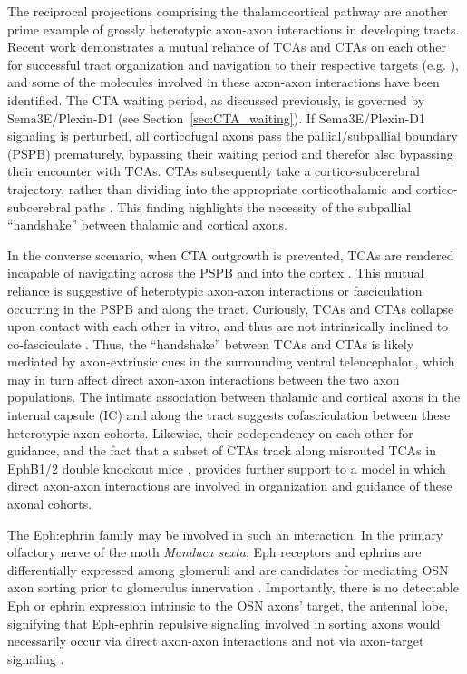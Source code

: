 The reciprocal projections comprising the thalamocortical pathway are another prime example of grossly heterotypic axon-axon interactions in developing tracts.
Recent work demonstrates a mutual reliance of TCAs and CTAs on each other for successful tract organization and navigation to their respective targets (e.g. ), and some of the molecules involved in these axon-axon interactions have been identified.
The CTA waiting period, as discussed previously, is governed by Sema3E/Plexin-D1 (see Section~\ref{sec:CTA_waiting}).
If Sema3E/Plexin-D1 signaling is perturbed, all corticofugal axons pass the pallial/subpallial boundary (PSPB) prematurely, bypassing their waiting period and therefor also bypassing their encounter with TCAs.
CTAs subsequently take a cortico-subcerebral trajectory, rather than dividing into the appropriate corticothalamic and cortico-subcerebral paths \cite{deck2013pathfinding}.
This finding highlights the necessity of the subpallial ``handshake'' between thalamic and cortical axons.

In the converse scenario, when CTA outgrowth is prevented, TCAs are rendered incapable of navigating across the PSPB and into the cortex \cite{chen2012evidence}.
This mutual reliance is suggestive of heterotypic axon-axon interactions or fasciculation occurring in the PSPB and along the tract.
Curiously, TCAs and CTAs collapse upon contact with each other in vitro, and thus are not intrinsically inclined to co-fasciculate \cite{bagnard2001axonal}.
Thus, the ``handshake'' between TCAs and CTAs is likely mediated by axon-extrinsic cues in the surrounding ventral telencephalon, which may in turn affect direct axon-axon interactions between the two axon populations.
The intimate association between thalamic and cortical axons in the internal capsule (IC) and along the tract \cite{molnar1998mechanisms} suggests cofasciculation between these heterotypic axon cohorts.
Likewise, their codependency on each other for guidance, and the fact that a subset of CTAs track along misrouted TCAs in EphB1/2 double knockout mice \cite{robichaux2014ephb}, provides further support to a model in which direct axon-axon interactions are involved in organization and guidance of these axonal cohorts.

The Eph:ephrin family may be involved in such an interaction.
In the primary olfactory nerve of the moth \emph{Manduca sexta}, Eph receptors and ephrins are differentially expressed among glomeruli and are candidates for mediating OSN axon sorting prior to glomerulus innervation \cite{kaneko2003interaxonal}.
Importantly, there is no detectable Eph or ephrin expression intrinsic to the OSN axons’ target, the antennal lobe, signifying that Eph-ephrin repulsive signaling involved in sorting axons would necessarily occur via direct axon-axon interactions and not via axon-target signaling \cite{kaneko2003interaxonal}.

